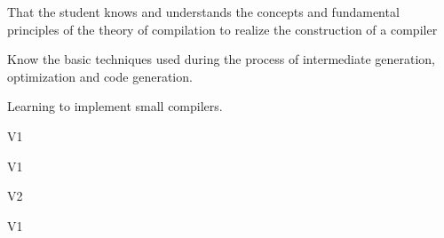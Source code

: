 \begin{syllabus}


\begin{justification}
That the student knows and understands the concepts and fundamental principles of the theory of compilation to realize the construction of a compiler
\end{justification}

\begin{goals}
\item Know the basic techniques used during the process of intermediate generation, optimization and code generation.
\item Learning to implement small compilers.
\end{goals}

\begin{outcomes}{V1}
    \item {}
    \item {}
    \item {}
\end{outcomes}

\begin{specificoutcomes}{V1}
	\item {}
	\item {}
	\item {}
	\item {}
	\item {}
	\item {}
\end{specificoutcomes}

\begin{outcomes}{V2}
    \item {}
    \item {}
    \item {}
\end{outcomes}

\begin{competences}{V1}
    \item {} 
    \item {} 
\end{competences}


\end{syllabus}
